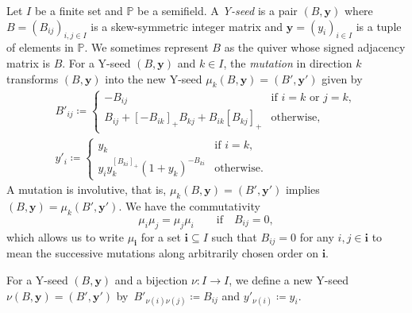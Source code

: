 \documentclass[pdftex]{sigma}
\numberwithin{equation}{section}
\theoremstyle{definition}
\newcommand*{\maxzero}[1]{[#1]_{+}}
\begin{document}
Let $I$ be a finite set and $\mathbb{P}$ be a semifield.
A \emph{Y-seed} is a pair $(B, \boldsymbol{y})$ where $B = (B_{ij})_{i,j \in I}$ is a skew-symmetric integer matrix and
$\boldsymbol{y} = (y_i)_{i \in I}$ is a tuple of elements in $\mathbb{P}$.
We sometimes represent $B$ as the quiver whose signed adjacency matrix is $B$.
For a Y-seed $(B, \boldsymbol{y})$ and $k \in I$, the \emph{mutation} in direction $k$ transforms $(B, \boldsymbol{y})$ into the
new Y-seed $\mu_k(B, \boldsymbol{y}) = (B', \boldsymbol{y}')$ given by
\begin{gather*}
 B'_{ij} \coloneqq
 \begin{cases}
 -B_{ij} & \text{if $i=k$ or $j=k$}, \\
 B_{ij} +
 \maxzero{- B_{ik}} B_{kj} +
 B_{ik} \maxzero{ B_{kj}} & \text{otherwise},
 \end{cases} \\
 y'_i \coloneqq
 \begin{cases}
 y_k & \text{if $i=k$}, \\
 y_i y_k^{\maxzero{B_{ki}}} (1 + y_k)^{-B_{ki}}
 & \text{otherwise}.
 \end{cases}
\end{gather*}
A mutation is involutive, that is, $\mu_k (B, \boldsymbol{y}) = (B', \boldsymbol{y}')$ implies
$(B, \boldsymbol{y}) = \mu_k (B', \boldsymbol{y}')$.
We have the commutativity
\begin{equation}\label{eq:mutation comm}
 \mu_i \mu_j = \mu_j \mu_i \qquad \text{if}\quad B_{ij} = 0,
\end{equation}
which allows us to write $\mu_{\boldsymbol{i}}$ for a set $\boldsymbol{i} \subseteq I$
such that $B_{ij} = 0$ for any $i,j \in \boldsymbol{i}$
to mean the successive mutations along arbitrarily chosen order on $\boldsymbol{i}$.

For a Y-seed $(B, \boldsymbol{y})$ and a bijection $\nu \colon I \to I$, we define a new Y-seed
$\nu(B, \boldsymbol{y}) = (B', \boldsymbol{y}')$ by~${B'_{\nu(i)\nu(j)} \coloneqq B_{ij}}$ and $y'_{\nu(i)} \coloneqq y_i$.
\end{document}
